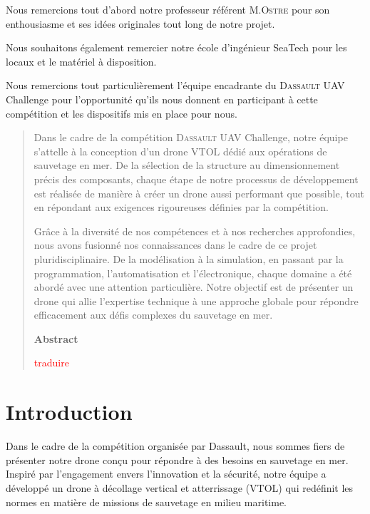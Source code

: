 \documentclass[a4paper,12pt,french]{report}
\begin{document}
Nous remercions tout d'abord notre professeur référent M.\textsc{Ostre} pour son enthousiasme et ses idées originales tout long de notre projet.\newline

Nous souhaitons également remercier notre école d'ingénieur SeaTech pour les locaux et le matériel à disposition.\newline

Nous remercions tout particulièrement l'équipe encadrante du \textsc{Dassault} UAV Challenge pour l'opportunité qu'ils nous donnent en participant à cette compétition et les dispositifs mis en place pour nous.

\tableofcontents


\begin{abstract}
    Dans le cadre de la compétition \textsc{Dassault} UAV Challenge, notre équipe s'attelle à la conception d'un drone VTOL dédié aux opérations de sauvetage en mer. De la sélection de la structure au dimensionnement précis des composants, chaque étape de notre processus de développement est réalisée de manière à créer un drone aussi performant que possible, tout en répondant aux exigences rigoureuses définies par la compétition.

    Grâce à la diversité de nos compétences et à nos recherches approfondies, nous avons fusionné nos connaissances dans le cadre de ce projet pluridisciplinaire. De la modélisation à la simulation, en passant par la programmation, l'automatisation et l'électronique, chaque domaine a été abordé avec une attention particulière. Notre objectif est de présenter un drone qui allie l'expertise technique à une approche globale pour répondre efficacement aux défis complexes du sauvetage en mer. \vskip4cm

    \begin{center}
        \bfseries Abstract
    \end{center}

    \noindent
    \textcolor{red}{traduire}
\end{abstract}

\chapter*{Introduction}

Dans le cadre de la compétition organisée par Dassault, nous sommes fiers de présenter notre drone conçu pour répondre à des besoins en sauvetage en mer. Inspiré par l'engagement envers l'innovation et la sécurité, notre équipe a développé un drone à décollage vertical et atterrissage (VTOL) qui redéfinit les normes en matière de missions de sauvetage en milieu maritime.\newline
\end{document}

